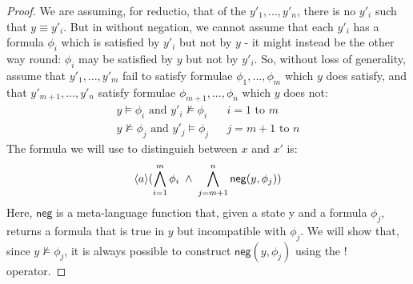 \begin{proof}
We are assuming, for reductio, that of the $y'_1, ..., y'_n$, there is no $y'_i$ such that $y \equiv y'_i$.
But in \cathoristic{} without negation, we cannot assume that each $y'_i$ has a formula $\phi_i$ which is satisfied by $y'_i$ but not by $y$ - it might instead be the other way round: $\phi_i$ may be satisfied by $y$ but not by $y'_i$. So, without loss of generality, assume that $y'_1, ..., y'_m$ fail to satisfy formulae $\phi_1, ..., \phi_m$ which $y$ does satisfy, and that $y'_{m+1}, ..., y'_n$ satisfy formulae $\phi_{m+1}, ..., \phi_n$ which $y$ does not:
\begin{eqnarray*}
y \models \phi_i \mbox{ and } y'_i \nvDash \phi_i & & i = 1 \mbox{ to } m  \\
y \nvDash \phi_j \mbox{ and } y'_j \models \phi_j & & j = m+1 \mbox{ to } n 
\end{eqnarray*}
The formula we will use to distinguish between $x$ and $x'$ is:
\[
 \langle a \rangle ( \bigwedge_{i=1}^m \phi_i \; \land \; \bigwedge_{j=m+1}^n \mathsf{neg}(y, \phi_j))
 \]
 Here, $\mathsf{neg}$ is a meta-language function that, given a state y and a formula $\phi_j$, returns a formula that is true in $y$ but incompatible with $\phi_j$. We will show that, since $y \nvDash \phi_j$, it is always possible to construct $ \mathsf{neg}(y, \phi_j)$ using the $!$ operator.


\end{proof}
